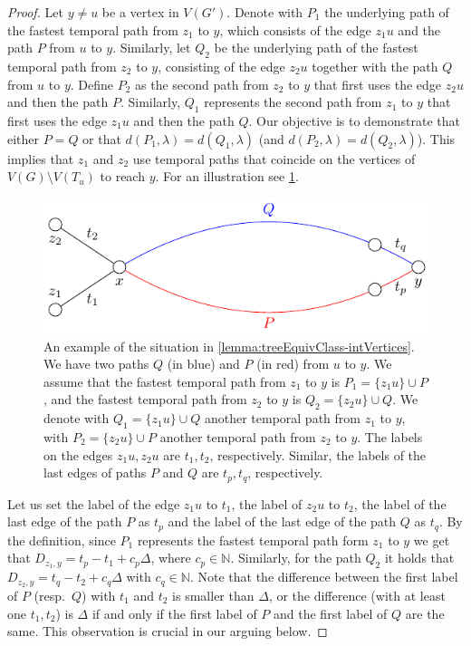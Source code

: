 \documentclass[a4paper,UKenglish,cleveref, autoref, thm-restate]{lipics-v2021}
\begin{document}
\begin{proof}
    Let $y \neq u$ be a vertex in $V(G')$.
    Denote with $P_1$ the underlying path of the fastest temporal path from $z_1$ to $y$, which consists of the edge $z_1 u$ and the path $P$ from $u$ to $y$.
    Similarly, let $Q_2$ be the underlying path of the fastest temporal path from $z_2$ to $y$, consisting of the edge $z_2u$ together with the path $Q$ from $u$ to $y$.
    Define $P_2$ as the second path from $z_2$ to $y$ that first uses the edge $z_2u$ and then the path $P$.
    Similarly, $Q_1$ represents the second path from $z_1$ to $y$ that first uses the edge $z_1u$ and then the path $Q$.
    Our objective is to demonstrate that either $P = Q$ or that $d(P_1, \lambda) = d(Q_1, \lambda)$ (and $d(P_2, \lambda) = d(Q_2, \lambda)$).
    This implies that $z_1$ and $z_2$ use temporal paths that coincide on the vertices of $V(G) \setminus V(T_u)$ to reach $y$. For an illustration see \cref{fig:FPT-equivClass}.

    \begin{figure}[t]
	\centering
	\includegraphics[width=0.6\columnwidth]{fig-fpt-equivClass}
	\caption{An example of the situation in \cref{lemma:treeEquivClass-intVertices}.
        We have two paths $Q$ (in blue) and $P$ (in red) from $u$ to $y$.
        We assume that the fastest temporal path from $z_1$ to $y$ is $P_1 = \{z_1 u\} \cup P$,
		and the fastest temporal path from $z_2$ to $y$ is $Q_2 = \{z_2 u\} \cup Q$.
        We denote with $Q_1 = \{z_1 u\} \cup Q$ another temporal path from $z_1$ to $y$, 
        with $P_2 = \{z_2 u\} \cup P$ another temporal path from $z_2$ to $y$.
        The labels on the edges $z_1 u, z_2 u$ are $t_1,t_2$, respectively. Similar, the labels of the last edges of paths $P$ and $Q$ are  $t_p, t_q$, respectively.
		\label{fig:FPT-equivClass}}
\end{figure}
    
    Let us set the label of the edge $z_1u$ to $t_1$, the label of $z_2u$ to $t_2$, the label of the last edge of the path $P$ as $t_p$ and the label of the last edge of the path $Q$ as $t_q$.
    By the definition, since $P_1$ represents the fastest temporal path form $z_1$ to $y$ we get that
        $D_{z_1,y} = t_p - t_1 + c_p \Delta$, where $c_p \in \mathbb{N}$.
    Similarly, for the path $Q_2$ it holds that $D_{z_2,y} = t_q - t_2 + c_q \Delta$ with $c_q \in \mathbb{N}$.
    Note that the difference between the first label of $P$ (resp.~$Q$) with $t_1$ and $t_2$ is smaller than $\Delta$,
    or the difference (with at least one $t_1,t_2$) is $\Delta$ if and only if the first label of $P$ and the first label of $Q$ are the same. 
    This observation is crucial in our arguing below.
    

\end{proof}
\end{document}
